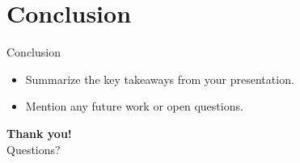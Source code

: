 \documentclass [xcolor=svgnames] {beamer}
\begin{document}
	\section{Conclusion}
	\begin{frame}{Conclusion}
		\begin{itemize}
			\item Summarize the key takeaways from your presentation.
			\item Mention any future work or open questions.
		\end{itemize}
	\end{frame}
	
	\begin{frame}
		\centering
		\textbf{Thank you!}\\
		Questions?
	\end{frame}
	
\end{document}
